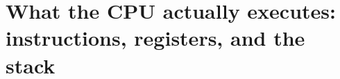 \chapter{What the CPU actually executes: instructions, registers, and the stack}
\label{ch:what-the-cpu-actually-executes}

